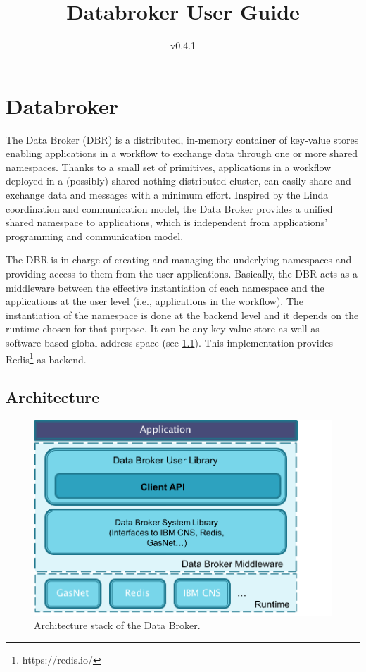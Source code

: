 
\newcommand{\ilist}[1]{\lstinline[style=myinlinestyle,basicstyle=\ttfamily,]{#1}}

\title{Databroker User Guide}
\date{v0.4.1}


\maketitle
\section{Databroker}
\label{sec:interface}

The Data Broker (DBR) is a distributed, in-memory container of key-value stores enabling applications in a workflow to exchange data through one or more shared namespaces.
Thanks to a small set of primitives, applications in a workflow deployed in a (possibly) shared nothing distributed cluster, can easily share and exchange data and messages with a minimum effort. Inspired by the Linda coordination and communication model, the Data Broker provides a unified shared namespace to applications, which is independent from applications' programming and communication model.



The DBR is in charge of creating  and managing  the underlying namespaces and providing access to them from the user applications.
Basically, the DBR  acts as a middleware between the effective instantiation of each namespace and the applications at the user level (i.e., applications in the workflow).
The instantiation of the namespace is done at the backend level and it depends on the runtime chosen for that purpose. It can be any key-value store as well as software-based global address space (see \ref{sec:arch}). This implementation provides Redis\footnote{https://redis.io/} as backend.

\subsection{Architecture}
\label{sec:arch}
\begin{figure}[!htb]
	\centering
	\includegraphics[width=0.7\linewidth]{fig/architecture}
	\caption{Architecture stack of the Data Broker.}
	\label{fig:architecture}
\end{figure}


